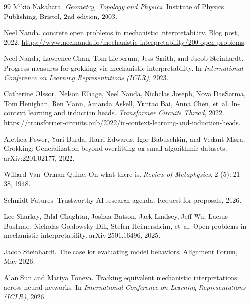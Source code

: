 \documentclass{article}
\begin{document}
\begin{thebibliography}{99}
Mikio Nakahara.
\newblock \emph{Geometry, Topology and Physics}.
\newblock Institute of Physics Publishing, Bristol, 2nd edition, 2003.

Neel Nanda.
 concrete open problems in mechanistic interpretability.
\newblock Blog post, 2022.
\newblock \url{https://www.neelnanda.io/mechanistic-interpretability/200-open-problems}.

Neel Nanda, Lawrence Chan, Tom Lieberum, Jess Smith, and Jacob Steinhardt.
\newblock Progress measures for grokking via mechanistic interpretability.
\newblock In \emph{International Conference on Learning Representations (ICLR)}, 2023.

Catherine Olsson, Nelson Elhage, Neel Nanda, Nicholas Joseph, Nova DasSarma,
  Tom Henighan, Ben Mann, Amanda Askell, Yuntao Bai, Anna Chen, et~al.
\newblock In-context learning and induction heads.
\newblock \emph{Transformer Circuits Thread}, 2022.
\newblock \url{https://transformer-circuits.pub/2022/in-context-learning-and-induction-heads}.

Alethea Power, Yuri Burda, Harri Edwards, Igor Babuschkin, and Vedant Misra.
\newblock Grokking: Generalization beyond overfitting on small algorithmic
  datasets.
\newblock arXiv:2201.02177, 2022.

Willard Van~Orman Quine.
\newblock On what there is.
\newblock \emph{Review of Metaphysics}, 2 (5): 21--38, 1948.

Schmidt Futures.
\newblock Trustworthy AI research agenda.
\newblock Request for proposals, 2026.

Lee Sharkey, Bilal Chughtai, Joshua Batson, Jack Lindsey, Jeff Wu, Lucius
  Bushnaq, Nicholas Goldowsky-Dill, Stefan Heimersheim, et~al.
\newblock Open problems in mechanistic interpretability.
\newblock arXiv:2501.16496, 2025.

Jacob Steinhardt.
\newblock The case for evaluating model behaviors.
\newblock Alignment Forum, May 2026.

Alan Sun and Mariya Toneva.
\newblock Tracking equivalent mechanistic interpretations across neural
  networks.
\newblock In \emph{International Conference on Learning Representations
  (ICLR)}, 2026.


\end{thebibliography}
\end{document}
